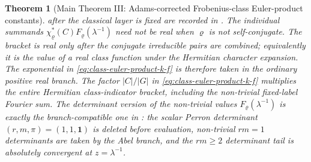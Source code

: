 \documentclass[11pt,a4paper]{amsart}
\theoremstyle{plain}
\newtheorem{theorem}{Theorem}[section]
\theoremstyle{definition}
\theoremstyle{remark}
\begin{document}
\begin{theorem}[Main Theorem III: Adams-corrected Frobenius-class
  Euler-product constants]
  after the classical layer is fixed are recorded in
  .
  The individual summands
  \(\chi_\varrho^\ast(C)F_\varrho(\lambda^{-1})\) need not be real when
  \(\varrho\) is not self-conjugate.  The bracket is real only after the
  conjugate irreducible pairs are combined; equivalently it is the value of a
  real class function under the Hermitian character expansion.  The
  exponential in \eqref{eq:class-euler-product-k-f} is therefore taken in the
  ordinary positive real branch.  The factor \(|C|/|G|\) in
  \eqref{eq:class-euler-product-k-f} multiplies the entire Hermitian
  class-indicator bracket, including the non-trivial fixed-label Fourier sum.
  The determinant version of the non-trivial values
  \(F_\varrho(\lambda^{-1})\) is exactly the branch-compatible one in
  : the scalar Perron determinant
  \((r,m,\pi)=(1,1,\mathbf1)\) is deleted before evaluation, non-trivial
  \(rm=1\) determinants are taken by the Abel branch, and the \(rm\ge2\)
  determinant tail is absolutely convergent at \(z=\lambda^{-1}\).
\end{theorem}
\end{document}
